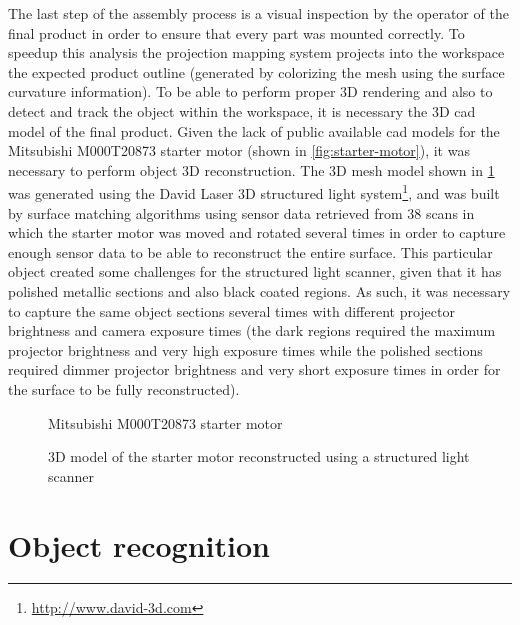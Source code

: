 The last step of the assembly process is a visual inspection by the operator of the final product in order to ensure that every part was mounted correctly. To speedup this analysis the projection mapping system projects into the workspace the expected product outline (generated by colorizing the mesh using the surface curvature information). To be able to perform proper 3D rendering and also to detect and track the object within the workspace, it is necessary the 3D \gls{cad} model of the final product. Given the lack of public available \gls{cad} models for the Mitsubishi M000T20873 starter motor (shown in \cref{fig:starter-motor}), it was necessary to perform object 3D reconstruction. The 3D mesh model shown in \cref{fig:object-reconstruction} was generated using the David Laser 3D structured light system\footnote{\url{http://www.david-3d.com}}, and was built by surface matching algorithms using sensor data retrieved from 38 scans in which the starter motor was moved and rotated several times in order to capture enough sensor data to be able to reconstruct the entire surface. This particular object created some challenges for the structured light scanner, given that it has polished metallic sections and also black coated regions. As such, it was necessary to capture the same object sections several times with different projector brightness and camera exposure times (the dark regions required the maximum projector brightness and very high exposure times while the polished sections required dimmer projector brightness and very short exposure times in order for the surface to be fully reconstructed).

\begin{figure}[H]
	\begin{floatrow}[2]
		{\caption{Mitsubishi M000T20873 starter motor}\label{fig:starter-motor}}
		{\caption{3D model of the starter motor reconstructed using a structured light scanner}\label{fig:object-reconstruction}}
	\end{floatrow}
\end{figure}



\section{Object recognition}\label{sec:object-recognition}


